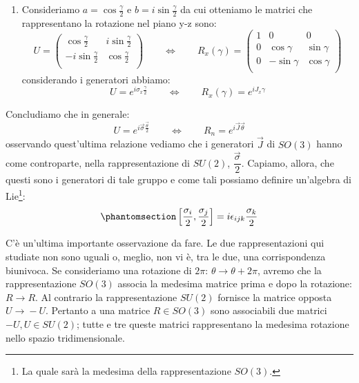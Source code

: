 \begin{enumerate}
    
    \item Consideriamo $a=\cos{\frac{\gamma}{2}}$ e $b=i\sin{\frac{\gamma}{2}}$ da cui otteniamo le matrici che rappresentano la rotazione nel piano y-z sono:
\begin{equation}
        U=\begin{pmatrix}
\cos{\frac{\gamma}{2}}  &i\sin{\frac{\gamma}{2}}\\
-i\sin{\frac{\gamma}{2}}&\cos{\frac{\gamma}{2}}\\
\end{pmatrix} \qquad\Longleftrightarrow\qquad   R_x(\gamma)= \begin{pmatrix}
  1&0&0\\
0& \cos{\gamma}&\sin{\gamma} \\
 0& -\sin{\gamma}&\cos{\gamma}\\
\end{pmatrix}
    \end{equation}
    considerando i generatori abbiamo:
    \begin{equation}
        U=e^{i\sigma_x\frac{\gamma}{2}} \qquad\Longleftrightarrow\qquad R_x(\gamma)= e^{iJ_x\gamma}
    \end{equation}
\end{enumerate}
Concludiamo che in generale:
\begin{equation}
        U=e^{i\Vec{\sigma}\frac{\Vec{\theta}}{2}} \qquad\Longleftrightarrow\qquad R_n= e^{i\Vec{J}\Vec{\theta}}
    \end{equation}
osservando quest'ultima relazione vediamo che i generatori $\Vec{J}$ di $SO(3)$ hanno come controparte, nella rappresentazione di $SU(2)$, $\dfrac{\Vec{\sigma}}{2}$. Capiamo, allora, che questi sono i generatori di tale gruppo e come tali possiamo definire un'algebra di Lie\footnote{La quale sarà la medesima della rappresentazione $SO(3).$}:
\begin{equation}\phantomsection\label{eq:alg_lie_su2}
    \left[\dfrac{\sigma_i}{2},\dfrac{\sigma_j}{2}\right]=i\epsilon_{ijk}\dfrac{\sigma_k}{2}
\end{equation}

C'è un'ultima importante osservazione da fare.
Le due rappresentazioni qui studiate non sono uguali o, meglio, non vi è, tra le due, una corrispondenza biunivoca.
Se consideriamo una rotazione di $2\pi$: $\theta\xrightarrow{}\theta+2\pi$, avremo che la rappresentazione $SO(3)$ associa la medesima matrice prima e dopo la rotazione: $R\xrightarrow{}R$. Al contrario la rappresentazione $SU(2)$ fornisce la matrice opposta $U\xrightarrow{}-U$. Pertanto a una matrice $R\in SO(3)$ sono associabili due matrici $-U,U\in SU(2)$; tutte e tre queste matrici rappresentano la medesima rotazione nello spazio tridimensionale.

